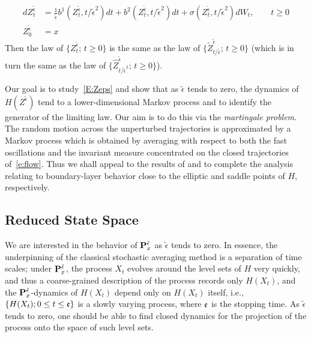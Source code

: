 \begin{equation}
\begin{aligned}
d Z_t^{\tilde\epsilon} &= \frac{1}{\tilde\epsilon} b^1 (Z_t^{\tilde\epsilon},t/\tilde\epsilon^2) dt + b^2 (Z_t^{\tilde\epsilon},t/\tilde\epsilon^2) dt
+ \sigma (Z_t^{\tilde\epsilon},t/\tilde\epsilon^2) d W_t, \qquad t \ge 0\\
Z^{\tilde\epsilon}_0 &= x
\end{aligned}
\label{E:Zeps}
\end{equation}
Then the law of $\{Z^{\tilde\epsilon}_t;\, t\ge 0\}$ is the same as the law of $\{\tilde Z^{\tilde\epsilon}_{t/\tilde\epsilon};\, t\ge 0\}$ (which is in turn the same as the law of $\{\hat Z^{\tilde\epsilon}_{t/\tilde\epsilon^2};\, t\ge 0\}$). 

Our goal is to study~\eqref{E:Zeps} and show that as $\tilde\epsilon$ tends to zero, the dynamics of $H(Z^{\tilde\epsilon})$ tend to a lower-dimensional Markov process and to identify the generator of the limiting law. Our aim is to do this via the \emph{martingale problem}. The random motion across the unperturbed trajectories is approximated by a Markov process which is obtained by averaging with respect to both the fast oscillations and the invariant measure concentrated on the closed trajectories of~\eqref{e:flow}. Thus we shall appeal to the results of \citet{namachchivaya01:_unified_approac_noisy_nonlin_mathieu_type_system} and \citet{sowers03:_stoch_averag_near_homoc_orbit} to complete the analysis relating to boundary-layer behavior close to the elliptic and saddle points of $H$, respectively.

\subsection{Reduced State Space}
\label{S:RSS}

We are interested in the behavior of $\mathbf P^{\tilde\epsilon}_x$ as $\tilde\epsilon$ tends to zero. In essence, the underpinning of the classical stochastic averaging method is a separation of time scales; under $\mathbf P^{\tilde\epsilon}_x$, the process $X_t$ evolves around the level sets of $H$ very quickly, and thus a coarse-grained description of the process records only $H(X_t)$, and the $\mathbf P^{\tilde\epsilon}_x$-dynamics of $H(X_t)$ depend only on $H(X_t)$ itself, i.e., $\{H(X_t); 0\le t \le \mathfrak e\}$ is a slowly varying process, where $\mathfrak e$ is the stopping time. As $\tilde\epsilon$ tends to zero, one should be able to find closed dynamics for the projection of the process onto the space of such level sets.

